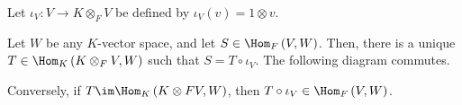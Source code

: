 \documentclass[10pt]{mypackage}
\begin{document}
  \begin{theorem}
    Let $\iota_{V}: V\rightarrow K\otimes_{F}V$ be defined by $\iota_{V}\left(v\right) = 1\otimes v$.\newline

    Let $W$ be any $K$-vector space, and let $S\in \Hom_{F}\left(V,W\right)$. Then, there is a unique $T\in \Hom_{K}\left(K\otimes_{F}V,W\right)$ such that $S = T\circ \iota_{V}$. The following diagram commutes.
    \begin{center}
    \end{center}
    Conversely, if $T\im \Hom_{K}\left(K\otimes F V,W\right)$, then $T\circ\iota_V \in \Hom_{F}\left(V,W\right)$.
  \end{theorem}
\end{document}
